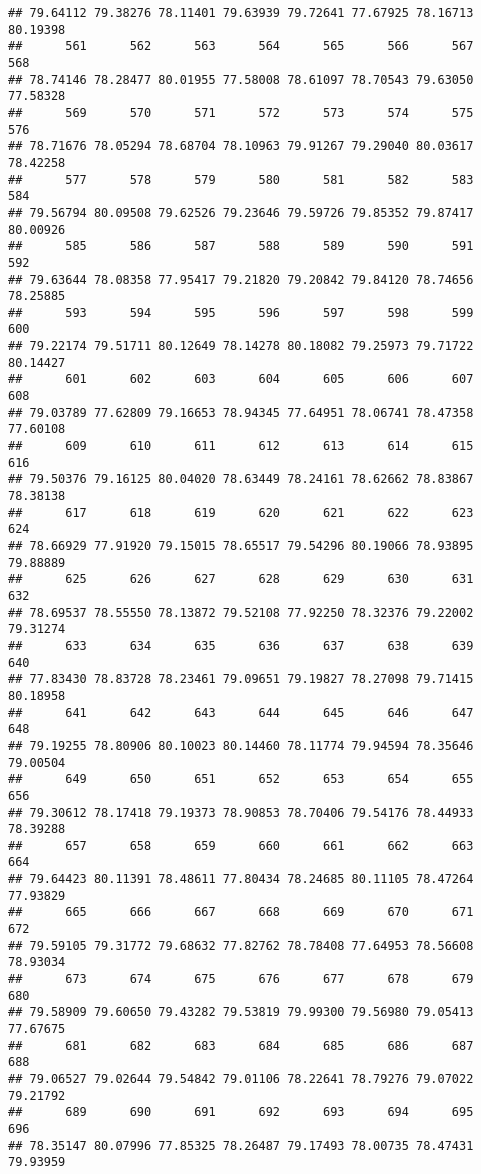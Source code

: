 \documentclass[
]{article}
\begin{document}
\begin{verbatim}
## 79.64112 79.38276 78.11401 79.63939 79.72641 77.67925 78.16713 80.19398 
##      561      562      563      564      565      566      567      568 
## 78.74146 78.28477 80.01955 77.58008 78.61097 78.70543 79.63050 77.58328 
##      569      570      571      572      573      574      575      576 
## 78.71676 78.05294 78.68704 78.10963 79.91267 79.29040 80.03617 78.42258 
##      577      578      579      580      581      582      583      584 
## 79.56794 80.09508 79.62526 79.23646 79.59726 79.85352 79.87417 80.00926 
##      585      586      587      588      589      590      591      592 
## 79.63644 78.08358 77.95417 79.21820 79.20842 79.84120 78.74656 78.25885 
##      593      594      595      596      597      598      599      600 
## 79.22174 79.51711 80.12649 78.14278 80.18082 79.25973 79.71722 80.14427 
##      601      602      603      604      605      606      607      608 
## 79.03789 77.62809 79.16653 78.94345 77.64951 78.06741 78.47358 77.60108 
##      609      610      611      612      613      614      615      616 
## 79.50376 79.16125 80.04020 78.63449 78.24161 78.62662 78.83867 78.38138 
##      617      618      619      620      621      622      623      624 
## 78.66929 77.91920 79.15015 78.65517 79.54296 80.19066 78.93895 79.88889 
##      625      626      627      628      629      630      631      632 
## 78.69537 78.55550 78.13872 79.52108 77.92250 78.32376 79.22002 79.31274 
##      633      634      635      636      637      638      639      640 
## 77.83430 78.83728 78.23461 79.09651 79.19827 78.27098 79.71415 80.18958 
##      641      642      643      644      645      646      647      648 
## 79.19255 78.80906 80.10023 80.14460 78.11774 79.94594 78.35646 79.00504 
##      649      650      651      652      653      654      655      656 
## 79.30612 78.17418 79.19373 78.90853 78.70406 79.54176 78.44933 78.39288 
##      657      658      659      660      661      662      663      664 
## 79.64423 80.11391 78.48611 77.80434 78.24685 80.11105 78.47264 77.93829 
##      665      666      667      668      669      670      671      672 
## 79.59105 79.31772 79.68632 77.82762 78.78408 77.64953 78.56608 78.93034 
##      673      674      675      676      677      678      679      680 
## 79.58909 79.60650 79.43282 79.53819 79.99300 79.56980 79.05413 77.67675 
##      681      682      683      684      685      686      687      688 
## 79.06527 79.02644 79.54842 79.01106 78.22641 78.79276 79.07022 79.21792 
##      689      690      691      692      693      694      695      696 
## 78.35147 80.07996 77.85325 78.26487 79.17493 78.00735 78.47431 79.93959 

\end{verbatim}
\end{document}
